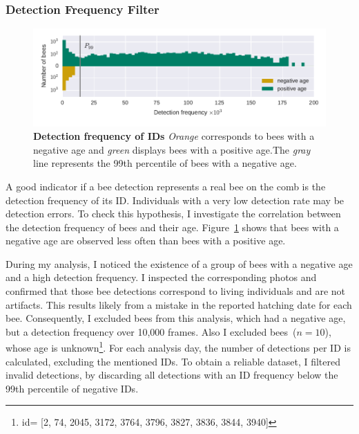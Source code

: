 \subsubsection{Detection Frequency Filter}
\label{subsubsec:dataset:filter}
\begin{figure}[t]
	\centering
	\includegraphics[width=1.0\textwidth]{Figures/filter}
	\caption[Detection frequency of IDs]{\textbf{Detection frequency of IDs} \emph{Orange} corresponds to bees with a negative age and \emph{green} displays bees with a positive age.\protect\footnotemark The \emph{gray} line represents the 99th percentile of bees with a negative age.}
	\label{fig:filter}
\end{figure}

A good indicator if a bee detection represents a real bee on the comb is the detection frequency of its ID.
Individuals with a very low detection rate may be detection errors.
To check this hypothesis, I investigate the correlation between the detection frequency of bees and their age.
Figure~\ref{fig:filter} shows that bees with a negative age are
observed less often than bees with a positive age.

During my analysis, I noticed the existence of a group of bees with a negative age and a high detection frequency.
I inspected the corresponding photos and confirmed that those bee detections correspond to living individuals and are not artifacts.
This results likely from a mistake in the reported hatching date for each bee.
Consequently, I excluded bees from this analysis, which had a negative age, but a detection frequency over 10,000 frames. Also I excluded bees~($n=10$), whose age is unknown\footnote{id= [2,
    74,
    2045,
    3172,
    3764,
    3796,
    3827,
    3836,
    3844,
    3940]}.
For each analysis day, the number of detections per ID is calculated, excluding the mentioned IDs.
To obtain a reliable dataset, I filtered invalid detections, by discarding all detections with an ID frequency below the 99th percentile of negative IDs.


